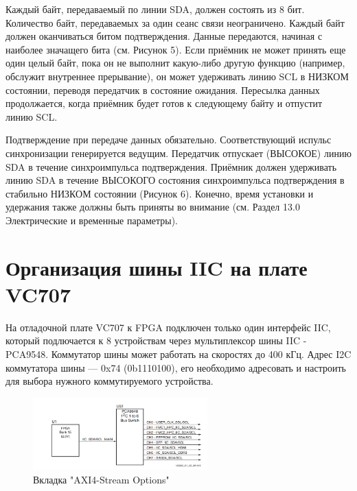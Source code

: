 Каждый байт, передаваемый по линии SDA, должен состоять из 8 бит. Количество байт, передаваемых за один сеанс связи неограничено. Каждый байт должен оканчиваться битом подтверждения. Данные передаются, начиная с наиболее значащего бита (см. Рисунок 5). Если приёмник не может принять еще один целый байт, пока он не выполнит какую-либо другую функцию (например, обслужит внутреннее прерывание), он может удерживать линию SCL в НИЗКОМ состоянии, переводя передатчик в состояние ожидания. Пересылка данных продолжается, когда приёмник будет готов к следующему байту и отпустит линию SCL.

Подтверждение при передаче данных обязательно. Соответствующий испульс
синхронизации генерируется ведущим. Передатчик отпускает (ВЫСОКОЕ) линию SDA в
течение синхроимпульса подтверждения. Приёмник должен удерживать линию SDA в
течение ВЫСОКОГО состояния синхроимпульса подтверждения в стабильно НИЗКОМ
состоянии (Рисунок 6). Конечно, время установки и удержания также должны быть
приняты во внимание (см. Раздел 13.0 Электрические и временные параметры).

\section{Организация шины IIC на плате VC707}

На отладочной плате VC707 к FPGA подключен только один интерфейс IIC, 
который подлючается к 8 устройствам через мультиплексор шины IIC - PCA9548.
Коммутатор шины может работать на скоростях до 400 кГц. Адрес I2C коммутатора шины — 0x74 (0b1110100), 
его необходимо адресовать и настроить для выбора нужного коммутируемого устройства.

\begin{figure}[h]
	\centering
	\includegraphics[width=0.6\textwidth]{image/PCA9548.png}
	\caption{Вкладка "AXI4-Stream Options"}
	\label{PCA9548.PNG}
\end{figure}

